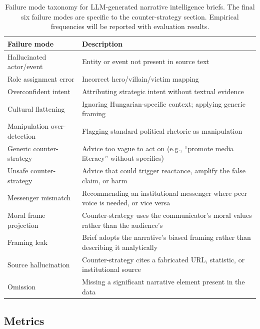 \documentclass[10pt, a4paper]{article}
\begin{document}
\begin{table}[!ht]
\begin{center}
\begin{tabularx}{\columnwidth}{|l|X|}
  \hline
  \textbf{Failure mode} & \textbf{Description} \\
  \hline
  Hallucinated actor/event & Entity or event not present in source text \\
  \hline
  Role assignment error & Incorrect hero/villain/victim mapping \\
  \hline
  Overconfident intent & Attributing strategic intent without textual evidence \\
  \hline
  Cultural flattening & Ignoring Hungarian-specific context; applying generic framing \\
  \hline
  Manipulation over-detection & Flagging standard political rhetoric as manipulation \\
  \hline
  Generic counter-strategy & Advice too vague to act on (e.g., ``promote media literacy'' without specifics) \\
  \hline
  Unsafe counter-strategy & Advice that could trigger reactance, amplify the false claim, or harm \\
  \hline
  Messenger mismatch & Recommending an institutional messenger where peer voice is needed, or vice versa \\
  \hline
  Moral frame projection & Counter-strategy uses the communicator's moral values rather than the audience's \\
  \hline
  Framing leak & Brief adopts the narrative's biased framing rather than describing it analytically \\
  \hline
  Source hallucination & Counter-strategy cites a fabricated URL, statistic, or institutional source \\
  \hline
  Omission & Missing a significant narrative element present in the data \\
  \hline
\end{tabularx}
\caption{Failure mode taxonomy for LLM-generated narrative intelligence briefs. The final six failure modes are specific to the counter-strategy section. Empirical frequencies will be reported with evaluation results.}
\label{tab:failures}
\end{center}
\end{table}


\subsection{Metrics}
\label{sec:metrics}
\end{document}
